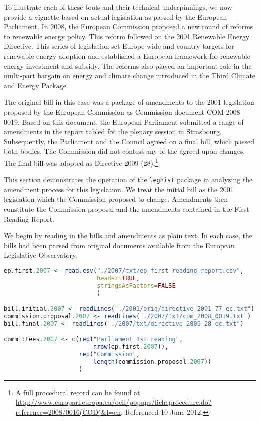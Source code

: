 \documentclass[11pt]{article}
\begin{document}
To illustrate each of these tools and their technical underpinnings,
we now provide a vignette based on actual legislation as passed by the
European Parliament. In 2008, the European Commission proposed a new
round of reforms to renewable energy policy. This reform followed
on the 2001 Renewable Energy Directive. This series of legislation set
Europe-wide and country targets for renewable energy adoption and
established a European framework for renewable energy investment and
subsidy. The reforms also played an important role in the multi-part
bargain on energy and climate change introduced in the Third Climate
and Energy Package.

The original bill in this case was a package of amendments to the 2001
legislation proposed by the European Commission as Commission document
COM 2008 0019. Based on this document, the European Parliament
submitted a range of amendments in the report tabled for the plenary
session in Strasbourg. Subsequently, the Parliament and the Council
agreed on a final bill, which passed both bodies. The Commission did
not contest any of the agreed-upon changes. The final bill was
adopted as Directive 2009 (28).\footnote{A full procedural record can
  be found at
  \url{http://www.europarl.europa.eu/oeil/popups/ficheprocedure.do?reference=2008/0016(COD)&l=en}. Referenced
10 June 2012.} 

This section demonstrates the operation of the \texttt{leghist}
package in analyzing the amendment process for this legislation. We
treat the initial bill as the 2001 legislation which the Commission
proposed to change. Amendments then constitute the Commission proposal
and the amendments contained in the First Reading
Report. 

We begin by reading in the bills and amendments as plain text. In each
case, the bills had been parsed from original documents available from
the European Legislative Observatory. 

\begin{lstlisting}[language=R, numbers=none]
ep.first.2007 <- read.csv("./2007/txt/ep_first_reading_report.csv",
                          header=TRUE,
                          stringsAsFactors=FALSE
                          )

bill.initial.2007 <- readLines("./2001/orig/directive_2001_77_ec.txt")
commission.proposal.2007 <- readLines("./2007/txt/com_2008_0019.txt")
bill.final.2007 <- readLines("./2007/txt/directive_2009_28_ec.txt")

committees.2007 <- c(rep("Parliament 1st reading",
                         nrow(ep.first.2007)),
                     rep("Commission",
                         length(commission.proposal.2007))
                     )

\end{lstlisting}
\end{document}
